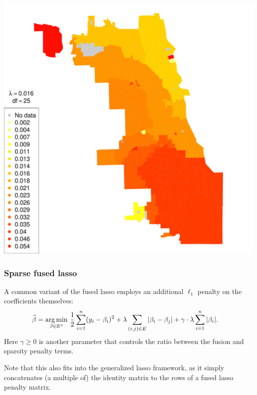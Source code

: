 \begin{frame}

  \includegraphics[height=\textheight]{img/chicago_rob_25df.pdf}

\end{frame}


\begin{frame}
  \frametitle{Sparse fused lasso}

A common variant of the fused lasso employs an additional $\ell_1$ penalty on
the coefficients themselves:
\begin{align*}
\widehat{\beta} &= \mathop{\mathrm{arg\,min}}_{\beta \in \mathbb{R}^n} \, \frac{1}{2} \sum_{i=1}^n (y_i-\beta_i)^2 +
\lambda \sum_{(i,j)\in E} |\beta_i-\beta_j| + \gamma \cdot \lambda \sum_{i=1}^n |\beta_i|.
\end{align*}
Here $\gamma \geq 0$ is another parameter that controls the ratio between the fusion
and sparsity penalty terms.

Note that this also fits into the generalized
lasso framework, as it simply concatenates (a multiple of) the identity matrix to the rows
of a fused lasso penalty matrix.

\end{frame}

